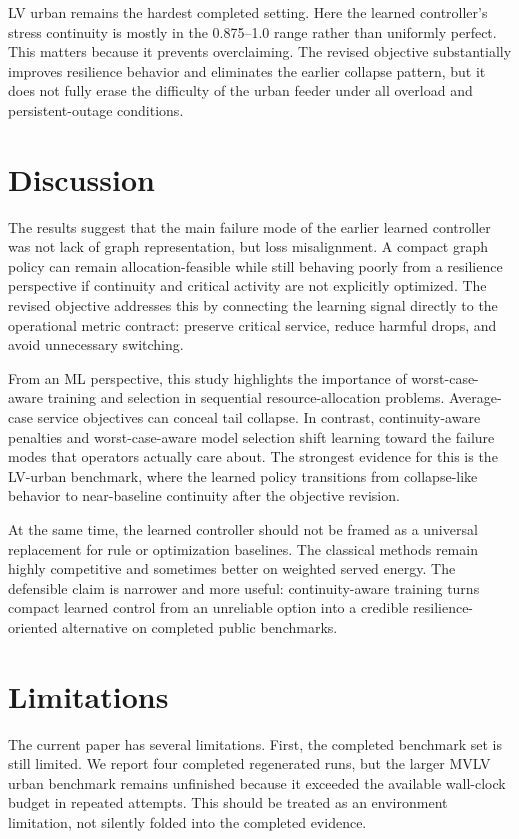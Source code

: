 \documentclass[11pt]{article}
\begin{document}
LV urban remains the hardest completed setting. Here the learned controller's stress continuity is mostly in the 0.875--1.0 range rather than uniformly perfect. This matters because it prevents overclaiming. The revised objective substantially improves resilience behavior and eliminates the earlier collapse pattern, but it does not fully erase the difficulty of the urban feeder under all overload and persistent-outage conditions.

\section{Discussion}

The results suggest that the main failure mode of the earlier learned controller was not lack of graph representation, but loss misalignment. A compact graph policy can remain allocation-feasible while still behaving poorly from a resilience perspective if continuity and critical activity are not explicitly optimized. The revised objective addresses this by connecting the learning signal directly to the operational metric contract: preserve critical service, reduce harmful drops, and avoid unnecessary switching.

From an ML perspective, this study highlights the importance of worst-case-aware training and selection in sequential resource-allocation problems. Average-case service objectives can conceal tail collapse. In contrast, continuity-aware penalties and worst-case-aware model selection shift learning toward the failure modes that operators actually care about. The strongest evidence for this is the LV-urban benchmark, where the learned policy transitions from collapse-like behavior to near-baseline continuity after the objective revision.

At the same time, the learned controller should not be framed as a universal replacement for rule or optimization baselines. The classical methods remain highly competitive and sometimes better on weighted served energy. The defensible claim is narrower and more useful: continuity-aware training turns compact learned control from an unreliable option into a credible resilience-oriented alternative on completed public benchmarks.

\section{Limitations}

The current paper has several limitations. First, the completed benchmark set is still limited. We report four completed regenerated runs, but the larger MVLV urban benchmark remains unfinished because it exceeded the available wall-clock budget in repeated attempts. This should be treated as an environment limitation, not silently folded into the completed evidence.
\end{document}
